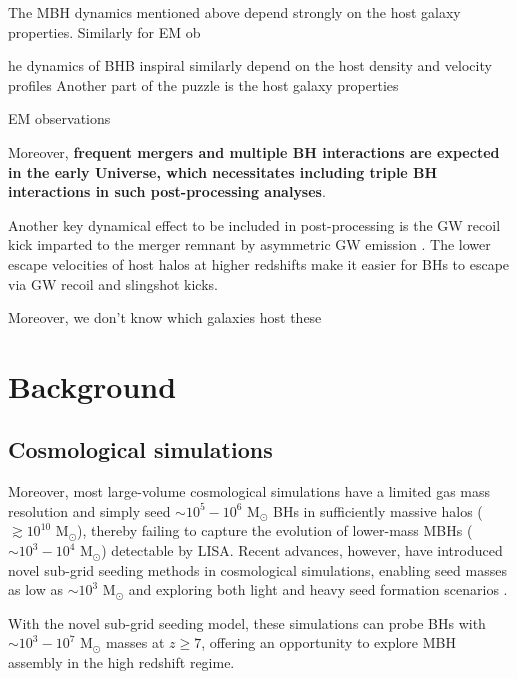 \documentclass[11pt, letterpaper]{article}
\newcommand{\msun}{M$_{\odot}$}
\begin{document}
The MBH dynamics mentioned above depend strongly on the host galaxy properties. Similarly for EM ob

he dynamics of BHB inspiral similarly depend on the host density and velocity profiles
Another part of the puzzle is the host galaxy properties

EM observations 



Moreover, \textbf{frequent mergers and multiple BH interactions are expected in the early Universe, which necessitates including triple BH interactions in such post-processing analyses}.

Another key dynamical effect to be included in post-processing is the GW recoil kick imparted to the merger remnant by asymmetric GW emission \cite{Bekenstein1973}.  The lower escape velocities of host halos at higher redshifts make it easier for BHs to escape via GW recoil and slingshot kicks.
    
Moreover, we don't know which galaxies host these 



\section{Background}

\subsection{Cosmological simulations}


Moreover, most large-volume cosmological simulations have a limited gas mass resolution and simply seed $\sim 10^5 - 10^6$ \msun{} BHs in sufficiently massive halos ($\gtrsim 10^{10}$ \msun{}), thereby failing to capture the evolution of lower-mass MBHs ($\sim 10^3 - 10^4$ \msun{}) detectable by LISA. Recent advances, however, have introduced novel sub-grid seeding methods in cosmological simulations, enabling seed masses as low as $\sim 10^3$ \msun{} and exploring both light and heavy seed formation scenarios \cite{bhowmick2023representinglowmassblack,bhowmick2024introducingbrahmasimulationsuite,bhowmick2024growthhighredshiftsupermassive,bhowmick2024signaturesblackholeseeding}. 


With the novel sub-grid seeding model, these simulations can probe BHs with $\sim 10^3 - 10^7$ \msun{} masses at $z \geq 7$, offering an opportunity to explore MBH assembly in the high redshift regime.  
\end{document}

